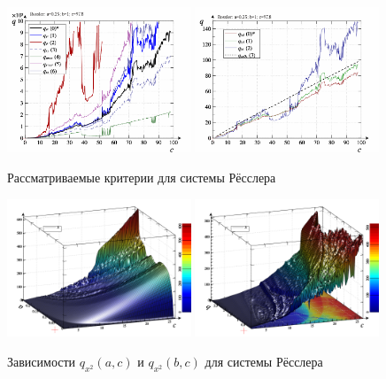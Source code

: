 \begin{figure}[ht!]
\begin{center}
  \includegraphics[width=0.49\textwidth]{p/cha/ross/ross_q-p_q.png}
  \hfill
  \includegraphics[width=0.49\textwidth]{p/cha/ross/ross_q-p_q1.png}
\end{center}
  \caption{Рассматриваемые критерии для системы Рёсслера}
\label{atu:f:ross_q}
\end{figure}

\begin{figure}[ht!]
\begin{center}
  \includegraphics[width=0.49\textwidth]{p/cha/ross/ross_pwr-x_a_c.png}
  \hfill
  \includegraphics[width=0.49\textwidth]{p/cha/ross/ross_pwr-x_b_c.png}
\end{center}
  \caption{Зависимости $q_{x^2}(a,c)$ и  $q_{x^2}(b,c) $ для системы Рёсслера}
\label{atu:f:ross_q_x2_ac_bc}
\end{figure}

